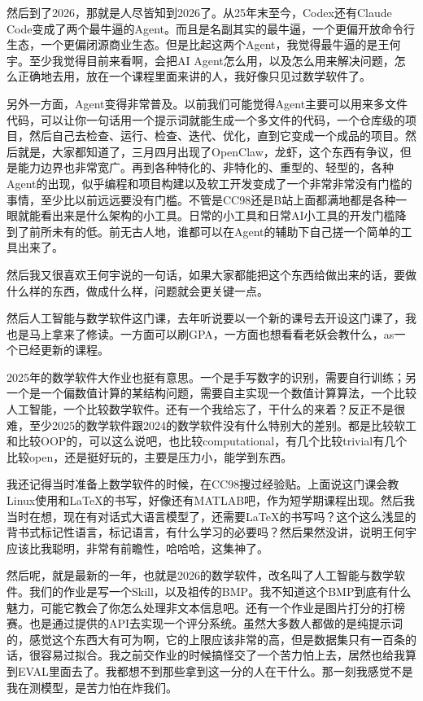 然后到了2026，那就是人尽皆知到2026了。从25年末至今，Codex还有Claude Code变成了两个最牛逼的Agent。而且是名副其实的最牛逼，一个更偏开放命令行生态，一个更偏闭源商业生态。但是比起这两个Agent，我觉得最牛逼的是王何宇。至少我觉得目前来看啊，会把AI Agent怎么用，以及怎么用来解决问题，怎么正确地去用，放在一个课程里面来讲的人，我好像只见过数学软件了。

另外一方面，Agent变得非常普及。以前我们可能觉得Agent主要可以用来多文件代码，可以让你一句话用一个提示词就能生成一个多文件的代码，一个仓库级的项目，然后自己去检查、运行、检查、迭代、优化，直到它变成一个成品的项目。然后就是，大家都知道了，三月四月出现了OpenClaw，龙虾，这个东西有争议，但是能力边界也非常宽广。再到各种特化的、非特化的、重型的、轻型的，各种Agent的出现，似乎编程和项目构建以及软工开发变成了一个非常非常没有门槛的事情，至少比以前远远要没有门槛。不管是CC98还是B站上面都满地都是各种一眼就能看出来是什么架构的小工具。日常的小工具和日常AI小工具的开发门槛降到了前所未有的低。前无古人地，谁都可以在Agent的辅助下自己搓一个简单的工具出来了。

然后我又很喜欢王何宇说的一句话，如果大家都能把这个东西给做出来的话，要做什么样的东西，做成什么样，问题就会更关键一点。

然后人工智能与数学软件这门课，去年听说要以一个新的课号去开设这门课了，我也是马上拿来了修读。一方面可以刷GPA，一方面也想看看老妖会教什么，as一个已经更新的课程。

2025年的数学软件大作业也挺有意思。一个是手写数字的识别，需要自行训练；另一个是一个偏数值计算的某结构问题，需要自主实现一个数值计算算法，一个比较人工智能，一个比较数学软件。还有一个我给忘了，干什么的来着？反正不是很难，至少2025的数学软件跟2024的数学软件没有什么特别大的差别。都是比较软工和比较OOP的，可以这么说吧，也比较computational，有几个比较trivial有几个比较open，还是挺好玩的，主要是压力小，能学到东西。

我还记得当时准备上数学软件的时候，在CC98搜过经验贴。上面说这门课会教Linux使用和LaTeX的书写，好像还有MATLAB吧，作为短学期课程出现。然后我当时在想，现在有对话式大语言模型了，还需要LaTeX的书写吗？这个这么浅显的背书式标记性语言，标记语言，有什么学习的必要吗？然后果然没讲，说明王何宇应该比我聪明，非常有前瞻性，哈哈哈，这集神了。

然后呢，就是最新的一年，也就是2026的数学软件，改名叫了人工智能与数学软件。我们的作业是写一个Skill，以及祖传的BMP。我不知道这个BMP到底有什么魅力，可能它教会了你怎么处理非文本信息吧。还有一个作业是图片打分的打榜赛。也是通过提供的API去实现一个评分系统。虽然大多数人都做的是纯提示词的，感觉这个东西大有可为啊，它的上限应该非常的高，但是数据集只有一百条的话，很容易过拟合。我之前交作业的时候搞怪交了一个苦力怕上去，居然也给我算到EVAL里面去了。我都想不到那些拿到这一分的人在干什么。那一刻我感觉不是我在测模型，是苦力怕在炸我们。

